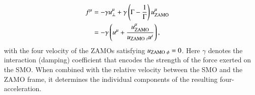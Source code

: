 \documentclass[aps,prx,reprint,superscriptaddress,nofootinbib,longbibliography]{revtex4-1}
\begin{document}
\begin{equation}
    \begin{aligned}
        f^{\mu}&=-\gamma u_{\perp}^{\mu}+\gamma\left(\Gamma-\frac{1}{\Gamma}\right)u^{\mu}_{\rm ZAMO}\\
        &=-\gamma\left(u^{\mu}+\frac{u^{\mu}_{\rm ZAMO}}{u_{{\rm ZAMO}\ t} u^{t}}\right),
    \end{aligned}
    \label{eq: force form}
\end{equation}
with the four velocity of the ZAMOs satisfying $u_{\rm ZAMO\ \phi}=0$. Here $\gamma$ denotes the interaction (damping) coefficient that encodes the strength of the force exerted on the SMO. When combined with the relative velocity between the SMO and the ZAMO frame, it determines the individual components of the resulting four-acceleration.
\end{document}
